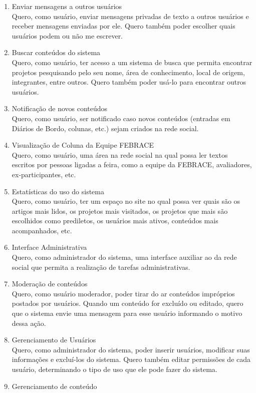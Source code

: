 \begin{enumerate}
      \item Enviar mensagens a outros usuários \\
        Quero, como usuário, enviar mensagens privadas de texto a outros usuários e receber mensagens enviadas por ele. Quero também poder escolher quais usuários podem ou não me escrever.
      \item Buscar conteúdos do sistema \\
        Quero, como usuário, ter acesso a  um sistema de busca que permita encontrar projetos pesquisando pelo seu nome, área de conhecimento, local de origem, integrantes, entre outros. Quero também poder usá-lo para encontrar outros usuários.
      \item Notificação de novos conteúdos \\
        Quero, como usuário, ser notificado caso novos conteúdos (entradas em Diários de Bordo, colunas, etc.) sejam criados na rede social.
      \item Visualização de Coluna da Equipe FEBRACE \\
        Quero, como usuário, uma área na rede social na qual possa ler textos escritos por pessoas ligadas a feira, como a equipe da FEBRACE, avaliadores, ex-participantes, etc.
      \item Estatísticas do uso do sistema \\
        Quero, como usuário, ter um espaço no site no qual possa ver quais são os artigos mais lidos, os projetos mais visitados, os projetos que mais são escolhidos como prediletos, os usuários mais ativos, conteúdos mais acompanhados, etc.
      \item Interface Administrativa \\
        Quero, como administrador do sistema, uma interface auxiliar ao da rede social que permita a realização de tarefas administrativas.
      \item Moderação de conteúdos \\
        Quero, como usuário moderador, poder tirar do ar conteúdos impróprios postados por usuários. Quando um conteúdo for excluído ou editado, quero que o sistema envie uma mensagem para esse usuário informando o motivo dessa ação.
      \item Gerenciamento de Usuários \\
        Quero, como administrador do sistema, poder inserir usuários, modificar suas informações e excluí-los do sistema. Quero também editar permissões de cada usuário, determinando o tipo de uso que ele pode fazer do sistema.
      \item Gerenciamento de conteúdo \\

\end{enumerate}
